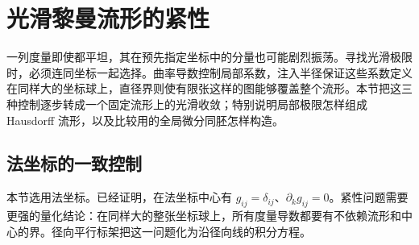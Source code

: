 
% 
% 

\section{光滑黎曼流形的紧性}
\label{g3:sec:2901}

一列度量即使都平坦，其在预先指定坐标中的分量也可能剧烈振荡。寻找光滑极限时，必须连同坐标一起选择。曲率导数控制局部系数，注入半径保证这些系数定义在同样大的坐标球上，直径界则使有限张这样的图能够覆盖整个流形。本节把这三种控制逐步转成一个固定流形上的光滑收敛；特别说明局部极限怎样组成 Hausdorff 流形，以及比较用的全局微分同胚怎样构造。

\subsection{法坐标的一致控制}
\label{g3:subsec:2901:01}
本节选用法坐标。已经证明，在法坐标中心有 \(g_{ij}=\delta_{ij}\)、\(\partial_kg_{ij}=0\)。紧性问题需要更强的量化结论：在同样大的整张坐标球上，所有度量导数都要有不依赖流形和中心的界。径向平行标架把这一问题化为沿径向线的积分方程。

